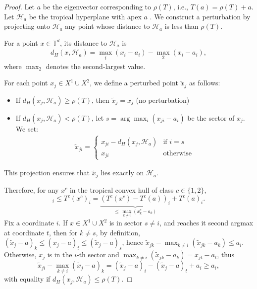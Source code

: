 \documentclass{article}
\renewcommand{\geq}{\geqslant}
\newcommand{\trop}{\mathbb{T}}
\begin{document}
\begin{proof}
Let $a$ be the eigenvector corresponding to $\rho(T)$, i.e., $T(a) = \rho(T) + a$. Let $\mathcal{H}_a$ be the tropical hyperplane with apex $a$ . We construct a perturbation by projecting onto $\mathcal{H}_a$ any point whose distance to $\mathcal{H}_a$ is less than $\rho(T)$.

For a point $x \in \trop^d$, its distance to $\mathcal{H}_a$ is
\begin{align}
d_H(x, \mathcal{H}_a) = \max_i(x_i - a_i) - \operatorname{\max}_2(x_i - a_i),
\end{align}
where $\operatorname{\max}_2$ denotes the second-largest value.

For each point $x_j \in X^1 \cup X^2$, we define a perturbed point $\tilde{x}_j$ as follows:
\begin{itemize}
\item If $d_H(x_j, \mathcal{H}_a) \geq \rho(T)$, then $\tilde{x}_j = x_j$ (no perturbation)
\item If $d_H(x_j, \mathcal{H}_a) < \rho(T)$, let $s = \arg\max_i(x_{ji} - a_i)$ be the sector of $x_j$. We set:
  \begin{align}
  \tilde{x}_{ji} = \begin{cases}
  x_{ji} - d_H(x_j, \mathcal{H}_a) & \text{if } i = s \\
  x_{ji} & \text{otherwise}
  \end{cases}
  \end{align}
\end{itemize}

This projection ensures that $\tilde{x}_j$ lies exactly on $\mathcal{H}_a$.

Therefore, for any $x^{c}$ in the tropical convex hull of class $c\in\{1,2\}$,
\begin{equation}
[x^{c}]_{i}\le T^{c}(x^{c})_{i}=\underbrace{\left(T^{c}(x^{c})-T^{c}(a)\right)_{i}}_{\le\,\max_{k\ne i}(x_{k}^{c}-a_{k})}+T^{c}(a)_{i}.\label{eq:major}
\end{equation}
Fix a coordinate $i$. If $x\in X^{1}\cup X^{2}$ is in sector $s\ne i$, and reaches it second argmax at coordinate $t$, then for $k\ne s$, by definition,
$(\tilde{x}_{j}-a)_{k}\le(x_{j}-a)_{t}\le(\tilde{x}_{j}-a)_{s}$,
hence $\tilde{x}_{jk}-\max_{k\ne i}(\tilde{x}_{jk}-a_{k})\le a_{i}$.
Otherwise, $x_{j}$ is in the $i$-th sector and $\max_{k\ne i}(\tilde{x}_{jk}-a_{k})=x_{jt}-a_{t}$,
thus
\[
\tilde{x}_{ji}-\max_{k\ne i}(\tilde{x}_{j}-a)_{k}=(\tilde{x}_{j}-a)_{i}-(\tilde{x}_{j}-a)_{t}+a_{i}\ge a_{i},
\]
with equality if $d_{H}\left(x_{j},\mathcal{H}_{a}\right)\le\rho(T)$.


\end{proof}
\end{document}
